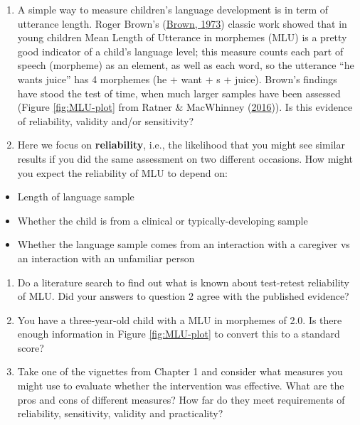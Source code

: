 \documentclass{krantz}
\providecommand{\tightlist}{%
\setlength{\itemsep}{0pt}\setlength{\parskip}{0pt}}
\begin{document}
\begin{enumerate}
\def\labelenumi{\arabic{enumi}.}
\item
  A simple way to measure children's language development is in term of utterance length. Roger Brown's (\protect\hyperlink{ref-brown1973}{Brown, 1973}) classic work showed that in young children Mean Length of Utterance in morphemes (MLU) is a pretty good indicator of a child's language level; this measure counts each part of speech (morpheme) as an element, as well as each word, so the utterance ``he wants juice'' has 4 morphemes (he + want + s + juice). Brown's findings have stood the test of time, when much larger samples have been assessed (Figure \ref{fig:MLU-plot} from Ratner \& MacWhinney (\protect\hyperlink{ref-ratner2016}{2016})). Is this evidence of reliability, validity and/or sensitivity?
\item
  Here we focus on \textbf{reliability}, i.e., the likelihood that you might see similar results if you did the same assessment on two different occasions. How might you expect the reliability of MLU to depend on:
\end{enumerate}

\begin{itemize}
\tightlist
\item
  Length of language sample
\item
  Whether the child is from a clinical or typically-developing sample
\item
  Whether the language sample comes from an interaction with a caregiver vs an interaction with an unfamiliar person
\end{itemize}

\begin{enumerate}
\def\labelenumi{\arabic{enumi}.}
\setcounter{enumi}{2}
\item
  Do a literature search to find out what is known about test-retest reliability of MLU. Did your answers to question 2 agree with the published evidence?
\item
  You have a three-year-old child with a MLU in morphemes of 2.0. Is there enough information in Figure \ref{fig:MLU-plot} to convert this to a standard score?
\item
  Take one of the vignettes from Chapter 1 and consider what measures you might use to evaluate whether the intervention was effective. What are the pros and cons of different measures? How far do they meet requirements of reliability, sensitivity, validity and practicality?
\end{enumerate}
\end{document}
